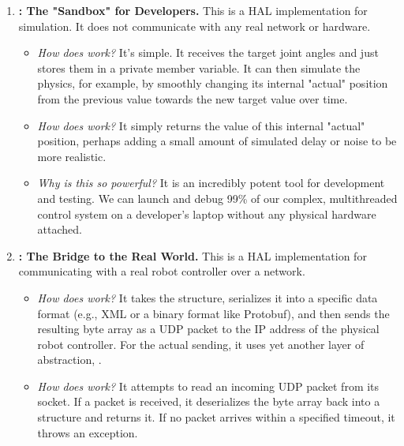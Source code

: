 \begin{enumerate}
    \item \textbf{: The "Sandbox" for Developers.} This is a HAL implementation for simulation. It does not communicate with any real network or hardware.
    \begin{itemize}
        \item \textit{How does  work?} It's simple. It receives the target joint angles and just stores them in a private member variable. It can then simulate the physics, for example, by smoothly changing its internal "actual" position from the previous value towards the new target value over time.
        \item \textit{How does  work?} It simply returns the value of this internal "actual" position, perhaps adding a small amount of simulated delay or noise to be more realistic.
        \item \textit{Why is this so powerful?} It is an incredibly potent tool for development and testing. We can launch and debug 99\% of our complex, multithreaded control system on a developer's laptop without any physical hardware attached.
    \end{itemize}
    
    \item \textbf{: The Bridge to the Real World.} This is a HAL implementation for communicating with a real robot controller over a network.
    \begin{itemize}
        \item \textit{How does  work?} It takes the  structure, serializes it into a specific data format (e.g., XML or a binary format like Protobuf), and then sends the resulting byte array as a UDP packet to the IP address of the physical robot controller. For the actual sending, it uses yet another layer of abstraction, .
        \item \textit{How does  work?} It attempts to read an incoming UDP packet from its socket. If a packet is received, it deserializes the byte array back into a  structure and returns it. If no packet arrives within a specified timeout, it throws an exception.
    \end{itemize}
\end{enumerate}

